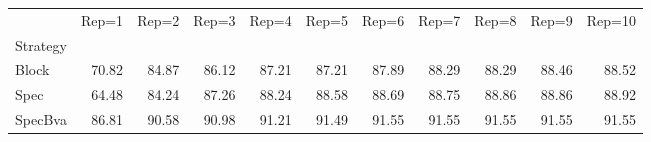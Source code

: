 \begin{tabular}{lrrrrrrrrrr}
\toprule
 & Rep=1 & Rep=2 & Rep=3 & Rep=4 & Rep=5 & Rep=6 & Rep=7 & Rep=8 & Rep=9 & Rep=10 \\
Strategy &  &  &  &  &  &  &  &  &  &  \\
\midrule
Block & 70.82 & 84.87 & 86.12 & 87.21 & 87.21 & 87.89 & 88.29 & 88.29 & 88.46 & 88.52 \\
Spec & 64.48 & 84.24 & 87.26 & 88.24 & 88.58 & 88.69 & 88.75 & 88.86 & 88.86 & 88.92 \\
SpecBva & 86.81 & 90.58 & 90.98 & 91.21 & 91.49 & 91.55 & 91.55 & 91.55 & 91.55 & 91.55 \\
\bottomrule
\end{tabular}
